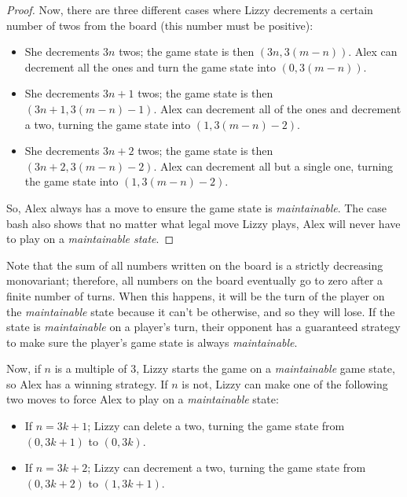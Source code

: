 \documentclass[10pt]{../usamts}
\begin{document}
\begin{solution}
\begin{proof}
    Now, there are three different cases where Lizzy decrements a certain number of twos from the board (this number must be positive):
    \begin{itemize}
        \item She decrements $3n$ twos; the game state is then $(3n, 3(m-n))$. Alex can decrement all the ones and turn the game state into $(0, 3(m-n))$.
        \item She decrements $3n+1$ twos; the game state is then $(3n+1, 3(m-n)-1)$. Alex can decrement all of the ones and decrement a two, turning the game state into $(1, 3(m-n)-2)$.
        \item She decrements $3n+2$ twos; the game state is then $(3n+2, 3(m-n)-2)$. Alex can decrement all but a single one, turning the game state into $(1, 3(m-n)-2)$.
    \end{itemize}

    So, Alex always has a move to ensure the game state is \textit{maintainable}. The case bash also shows that no matter what legal move Lizzy plays, Alex will never have to play on a \textit{maintainable state}.
\end{proof}

Note that the sum of all numbers written on the board is a strictly decreasing monovariant; therefore, all numbers on the board eventually go to zero after a finite number of turns. When this happens, it  will be the turn of the player on the \textit{maintainable} state because it can't be otherwise, and so they will lose. If the state is \textit{maintainable} on a player's turn, their opponent has a guaranteed strategy to make sure the player's game state is always \textit{maintainable}.

Now, if $n$ is a multiple of 3, Lizzy starts the game on a \textit{maintainable} game state, so Alex has a winning strategy. If $n$ is not, Lizzy can make one of the following two moves to force Alex to play on a \textit{maintainable} state:

\begin{itemize}
    \item If $n = 3k+1$; Lizzy can delete a two, turning the game state from $(0, 3k+1)$ to $(0, 3k)$.
    \item If $n = 3k+2$; Lizzy can decrement a two, turning the game state from $(0,3k+2)$ to $(1,3k+1)$.
\end{itemize}

\end{solution}
\end{document}
